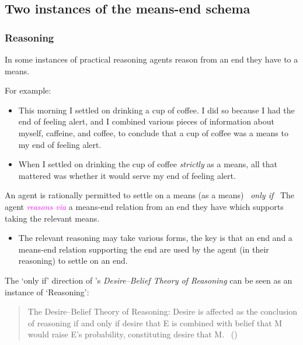 \documentclass[10pt]{article}
\newenvironment{beamerblock}[1]{%
  \tcolorbox[standard,%
  no shadow,
  noparskip,
  colback=white,
  colframe=black,
  colbacktitle=white,
  coltitle=black,
  colupper=black,
  size=small,
  boxrule=.125mm,
  fonttitle=\bfseries,
  sharp corners=all,
  title=#1]}%
{\endtcolorbox}
\newcommand{\hozlinedash}[0]{%
  \noindent\hdashrule[0.5ex][c]{\textwidth}{.1pt}{2.5pt}
}
\begin{document}
\hozlinedash

\newpage

\subsection{Two instances of the means-end schema}
\label{sec:two-instances-means}

\subsubsection{Reasoning}
\label{sec:reasoning}

In some instances of practical reasoning agents reason from an end they have to a means.

For example:
\begin{itemize}
\item This morning I settled on drinking a cup of coffee. I did so because I had the end of feeling alert, and I combined various pieces of information about myself, caffeine, and coffee, to conclude that a cup of coffee was a means to my end of feeling alert.
\item When I settled on drinking the cup of coffee \emph{strictly} as a means, all that mattered was whether it would serve my end of feeling alert.
\end{itemize}

\begin{beamerblock}{Reasoning}
  An agent is rationally permitted to settle on a means (as a means)
  \newline
  \mbox{ }\hfill\emph{only if}\hfill\mbox{ }
  \newline
  The agent \textcolor{fuchsia}{\emph{reasons via}} a means-end relation from an end they have which supports taking the relevant means.
\end{beamerblock}

\begin{itemize}
\item The relevant reasoning may take various forms, the key is that an end and a means-end relation supporting the end are used by the agent (in their reasoning) to settle on an end.
\end{itemize}

The `only if' direction of \citeauthor{Sinhababu:2017aa}'s \emph{Desire–Belief Theory of Reasoning} can be seen as an instance of `Reasoning':

\begin{quote}
  The Desire–Belief Theory of Reasoning: Desire is affected as the conclusion of reasoning if and only if desire that E is combined with belief that M would raise E’s probability, constituting desire that M.\nolinebreak
  \mbox{ }\hfill\mbox{(\citeyear[39]{Sinhababu:2017aa})}
\end{quote}
\end{document}
